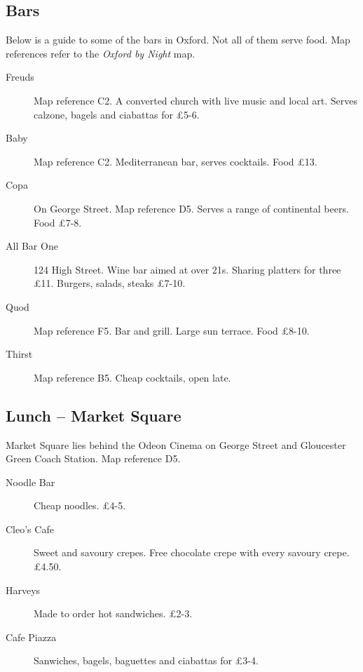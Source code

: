 \subsection{Bars}

Below is a guide to some of the bars in Oxford.  Not all of them serve food.  Map references refer to the \textit{Oxford by Night} map.

\begin{description}

\item[Freuds] Map reference C2.  A converted church with live music and local art.  Serves calzone, bagels and ciabattas for \pounds 5-6.

\item[Baby] Map reference C2.  Mediterranean bar, serves cocktails.  Food \pounds 13.

\item[Copa] On George Street.  Map reference D5.  Serves a range of continental beers.  Food \pounds 7-8.

\item[All Bar One] 124 High Street.  Wine bar aimed at over 21s.  Sharing platters for three \pounds 11.  Burgers, salads, steaks \pounds 7-10.

\item[Quod] Map reference F5. Bar and grill.  Large sun terrace.  Food \pounds 8-10.

\item[Thirst] Map reference B5.  Cheap cocktails, open late.  

\end{description}

\subsection{Lunch -- Market Square}

Market Square lies behind the Odeon Cinema on George Street and Gloucester Green Coach Station.  Map reference D5.

\begin{description}

\item[Noodle Bar] Cheap noodles.  \pounds 4-5.

\item[Cleo's Cafe] Sweet and savoury crepes.  Free chocolate crepe with every savoury crepe.  \pounds 4.50.

\item[Harveys] Made to order hot sandwiches.  \pounds 2-3.

\item[Cafe Piazza] Sanwiches, bagels, baguettes and ciabattas for \pounds 3-4.
  

\end{description}


